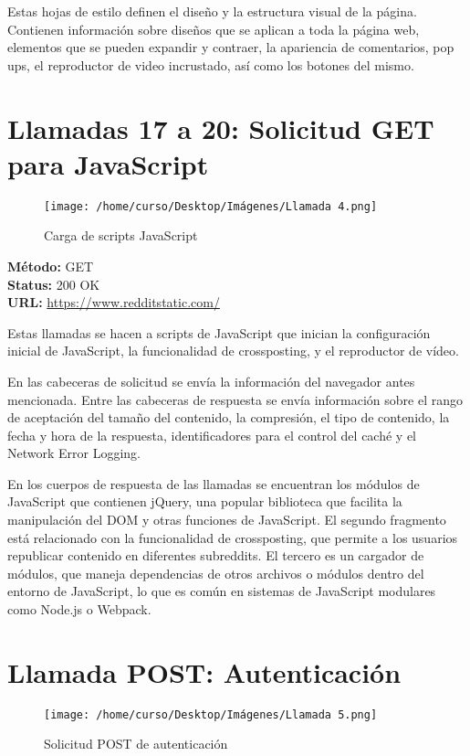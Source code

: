 \documentclass[a4paper,12pt]{article}
\begin{document}
Estas hojas de estilo definen el diseño y la estructura visual de la página. Contienen información sobre diseños que se aplican a toda la página web, elementos que se pueden expandir y contraer, la apariencia de comentarios, pop ups, el reproductor de video incrustado, así como los botones del mismo.

\section*{Llamadas 17 a 20: Solicitud GET para JavaScript}

\begin{figure}[h!]
    \centering
    \texttt{[image: /home/curso/Desktop/Imágenes/Llamada 4.png]}
    \caption{Carga de scripts JavaScript}
\end{figure}

\textbf{Método:} GET \\
\textbf{Status:} 200 OK \\
\textbf{URL:} \url{https://www.redditstatic.com/}

Estas llamadas se hacen a scripts de JavaScript que inician la configuración inicial de JavaScript, la funcionalidad de crossposting, y el reproductor de vídeo. 

En las cabeceras de solicitud se envía la información del navegador antes mencionada. Entre las cabeceras de respuesta se envía información sobre el rango de aceptación del tamaño del contenido, la compresión, el tipo de contenido, la fecha y hora de la respuesta, identificadores para el control del caché y el Network Error Logging.

En los cuerpos de respuesta de las llamadas se encuentran los módulos de JavaScript que contienen jQuery, una popular biblioteca que facilita la manipulación del DOM y otras funciones de JavaScript. El segundo fragmento está relacionado con la funcionalidad de crossposting, que permite a los usuarios republicar contenido en diferentes subreddits. El tercero es un cargador de módulos, que maneja dependencias de otros archivos o módulos dentro del entorno de JavaScript, lo que es común en sistemas de JavaScript modulares como Node.js o Webpack.

\section*{Llamada POST: Autenticación}

\begin{figure}[h!]
    \centering
    \texttt{[image: /home/curso/Desktop/Imágenes/Llamada 5.png]}
    \caption{Solicitud POST de autenticación}
\end{figure}
\end{document}
